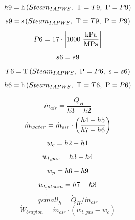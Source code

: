 \documentclass[10pt,fleqn]{article}
\newcommand{\F}[1]{\mbox{$#1$}}
\newcommand{\V}[1]{\mbox{$ #1 $}}
\newcommand{\temperature}{\mathrm{T}}
\newcommand{\enthalpy}{\mathrm{h}}
\newcommand{\entropy}{\mathrm{s}}
\begin{document}
\begin{equation}
\label{EES Eqn:39}
\V{h9}  =\enthalpy \left(\F{Steam}_{IAPWS},\mbox{\ T}=\V{T9} ,\mbox{\ P}=\V{P9}  \right)  
\end{equation}
\begin{equation}
\label{EES Eqn:40}
\V{s9} =\entropy \left(\F{Steam}_{IAPWS},\mbox{\ T}=\V{T9} ,\mbox{\ P}=\V{P9}  \right)  
\end{equation}
\begin{equation}
\label{EES Eqn:41}
\V{P6}  = 17\cdot \rm { \left|1000\ \frac {\rm{kPa}}{\rm{MPa}}\right|} 
\end{equation}
\begin{equation}
\label{EES Eqn:42}
\V{s6}  = \V{s9}  
\end{equation}
\begin{equation}
\label{EES Eqn:43}
\V{T6} =\temperature \left(\F{Steam}_{IAPWS},\mbox{\ P}=\V{P6} ,\mbox{\ s}=\V{s6}  \right)  
\end{equation}
\begin{equation}
\label{EES Eqn:44}
\V{h6} =\enthalpy \left(\F{Steam}_{IAPWS},\mbox{\ T}=\V{T6} ,\mbox{\ P}=\V{P6}  \right)  
\end{equation}
\begin{equation}
\label{EES Eqn:45}
\dot {m}_{air} = \frac {\dot {Q}_{H}}{ h3-h2 } 
\end{equation}
\begin{equation}
\label{EES Eqn:46}
\dot {m}_{water} = \dot {m}_{air}\cdot  \left( \frac {\V{h4} -\V{h5} }{ h7-h6 } \right)  
\end{equation}
\begin{equation}
\label{EES Eqn:47}
w_{c} = \V{h2}  - \V{h1}  
\end{equation}
\begin{equation}
\label{EES Eqn:48}
w_{t,gas} = \V{h3} -\V{h4}  
\end{equation}
\begin{equation}
\label{EES Eqn:49}
w_{p} = \V{h6} -\V{h9}  
\end{equation}
\begin{equation}
\label{EES Eqn:50}
w_{t,steam} = \V{h7} -\V{h8}  
\end{equation}
\begin{equation}
\label{EES Eqn:51}
\dot {qsmall}_{h} = \dot {Q}_{H}/\dot {m}_{air} 
\end{equation}
\begin{equation}
\label{EES Eqn:52}
\dot {W}_{brayton} =  \dot {m}_{air}\cdot  \left( w_{t,gas} - w_{c} \right)  
\end{equation}
\end{document}
